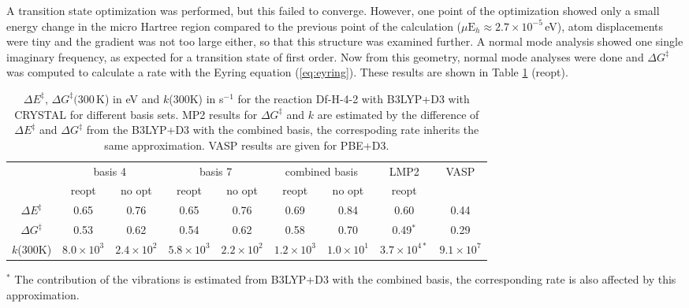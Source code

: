 \documentclass[11pt,DIV=13,BCOR=5mm,a4paper,headinclude]{scrbook}
\begin{document}
A transition state optimization was performed, but this failed to converge.
However, one point of the optimization showed only a small energy change in the micro Hartree region compared to the previous point of the calculation ($\mu\textrm{E}_h \approx 2.7\times 10^{-5}\,$eV), atom displacements were tiny and the gradient was not too large either, so that this structure was examined further.
A normal mode analysis showed one single imaginary frequency, as expected for a transition state of first order.
Now from this geometry, normal mode analyses were done and $\Delta G^\ddagger$ was computed to calculate a rate with the Eyring equation (\ref{eq:eyring}).
These results are shown in Table \ref{tab:k_crystal-reopt+noopt} (reopt).
\begin{table}[!h]
  \centering
  \caption{$\Delta E^\ddagger$, $\Delta G^\ddagger(300\,$K) in eV and $k$(300K) in s$^{-1}$ for the reaction Df-H-4-2 with B3LYP+D3 with CRYSTAL for different basis sets.
  MP2 results for $\Delta G^\ddagger$ and $k$ are estimated by the difference of $\Delta E^\ddagger$ and $\Delta G^\ddagger$ from the B3LYP+D3 with the combined basis, the correspoding rate inherits the same approximation.
  VASP results are given for PBE+D3.}
  \begin{tabular}{c|cc|cc|cc|c|c}%
  \toprule
   & \multicolumn{2}{c}{basis 4} &\multicolumn{2}{c}{basis 7} &\multicolumn{2}{c}{combined basis}&LMP2 &VASP\\ 
   & reopt & no opt & reopt & no opt &reopt & no opt & reopt& \\\midrule
   $\Delta E^\ddagger$ &0.65 & 0.76 &0.65 &0.76 &0.69 & 0.84 & 0.60&0.44\\
   $\Delta G^\ddagger$ &0.53 &0.62 &0.54 &0.62 &0.58 & 0.70 &0.49$^\ast$ &0.29\\
   $k$(300K) &$8.0\times 10^3$ &$2.4\times 10^2$ &$5.8\times 10^3$ &$2.2\times 10^2$ &$1.2\times 10^3$ &$1.0\times 10^1$ & $3.7\times 10^{4\ast}$& $9.1\times 10^7$\\\bottomrule
  \end{tabular}
  \begin{tablenotes}
 \footnotesize
\item[] $^\ast$ The contribution of the vibrations is estimated from B3LYP+D3 with the combined basis, the corresponding rate is also affected by this approximation.
\end{tablenotes}
  \label{tab:k_crystal-reopt+noopt}
\end{table}
\\
\end{document}
